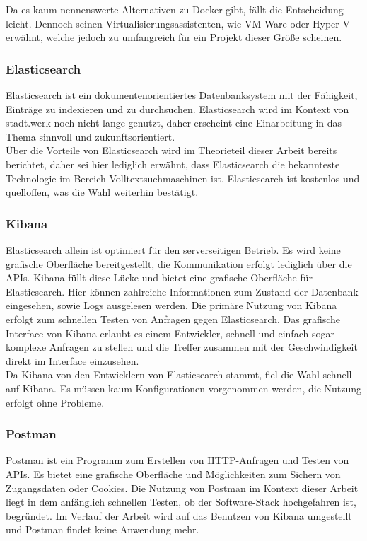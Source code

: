 \documentclass[a4paper]{scrartcl}
\begin{document}
Da es kaum nennenswerte Alternativen zu Docker gibt, fällt die Entscheidung leicht. Dennoch seinen Virtualisierungsassistenten, wie VM-Ware oder Hyper-V erwähnt, welche jedoch zu umfangreich für ein Projekt dieser Größe scheinen.

\subsubsection{Elasticsearch}
Elasticsearch ist ein dokumentenorientiertes Datenbanksystem mit der Fähigkeit, Einträge zu indexieren und zu durchsuchen. Elasticsearch wird im Kontext von stadt.werk noch nicht lange genutzt, daher erscheint eine Einarbeitung in das Thema sinnvoll und zukunftsorientiert. \\
Über die Vorteile von Elasticsearch wird im Theorieteil dieser Arbeit bereits berichtet, daher sei hier lediglich erwähnt, dass Elasticsearch die bekannteste Technologie im Bereich Volltextsuchmaschinen ist. Elasticsearch ist kostenlos und quelloffen, was die Wahl weiterhin bestätigt.

\subsubsection{Kibana}
Elasticsearch allein ist optimiert für den serverseitigen Betrieb. Es wird keine grafische Oberfläche bereitgestellt, die Kommunikation erfolgt lediglich über die APIs. Kibana füllt diese Lücke und bietet eine grafische Oberfläche für Elasticsearch. Hier können zahlreiche Informationen zum Zustand der Datenbank eingesehen, sowie Logs ausgelesen werden. Die primäre Nutzung von Kibana erfolgt zum schnellen Testen von Anfragen gegen Elasticsearch. Das grafische Interface von Kibana erlaubt es einem Entwickler, schnell und einfach sogar komplexe Anfragen zu stellen und die Treffer zusammen mit der Geschwindigkeit direkt im Interface einzusehen. \\
Da Kibana von den Entwicklern von Elasticsearch stammt, fiel die Wahl schnell auf Kibana. Es müssen kaum Konfigurationen vorgenommen werden, die Nutzung erfolgt ohne Probleme.

\subsubsection{Postman}
Postman ist ein Programm zum Erstellen von HTTP-Anfragen und Testen von APIs. Es bietet eine grafische Oberfläche und Möglichkeiten zum Sichern von Zugangsdaten oder Cookies. Die Nutzung von Postman im Kontext dieser Arbeit liegt in dem anfänglich schnellen Testen, ob der Software-Stack hochgefahren ist, begründet. Im Verlauf der Arbeit wird auf das Benutzen von Kibana umgestellt und Postman findet keine Anwendung mehr. \\
\end{document}
